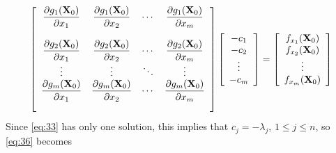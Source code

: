 \documentclass{article}
\newcommand{\dst}{\displaystyle}
\begin{document}
$$
\left[\begin{array}{ccccccc}
\dst{\frac{\partial{g_{1}({\bf X}_{0})}}{\partial{x_{1}}}}&
\dst{\frac{\partial{g_{1}({\bf X}_{0})}}{\partial{x_{2}}}}&
\cdots&
\dst{\frac{\partial{g_{1}({\bf X}_{0})}}{\partial{x_{m}}}}\\ \\
\dst{\frac{\partial{g_{2}({\bf X}_{0})}}{\partial{x_{1}}}}&
\dst{\frac{\partial{g_{2}({\bf X}_{0})}}{\partial{x_{2}}}}&
\cdots&
\dst{\frac{\partial{g_{2}({\bf X}_{0})}}{\partial{x_{m}}}}\\
\vdots&\vdots&\ddots&\vdots\\
\dst{\frac{\partial{g_{m}({\bf X}_{0})}}{\partial{x_{1}}}}&
\dst{\frac{\partial{g_{m}({\bf X}_{0})}}{\partial{x_{2}}}}&
\cdots&
\dst{\frac{\partial{g_{m}({\bf X}_{0})}}{\partial{x_{m}}}}\\ \\
\end{array}\right]
\left[\begin{array}{ccccccc}
-c_{1}\\-c_{2}\\ \vdots\\-c_{m}
\end{array}\right]=
\left[\begin{array}{ccccccc}
f_{x_{1}}({\bf X}_{0})\\f_{x_{2}}({\bf X}_{0})\\\vdots\\ f_{x_{m}}({\bf
X}_{0})
\end{array}\right]
$$
Since  \eqref{eq:33}  has only one solution,
 this implies that
$c_{j}=-\lambda_{j}$, $1\le j\le n$, so \eqref{eq:36}  becomes
\end{document}
